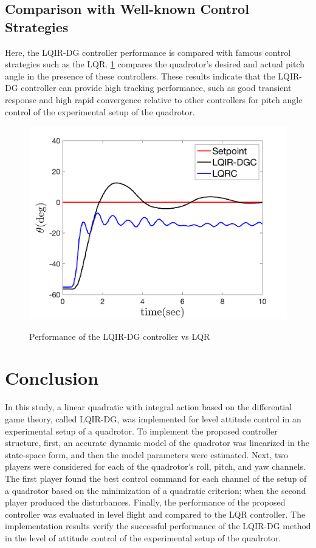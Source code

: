 \documentclass[conference]{IEEEtran}
\begin{document}
\subsection{Comparison with Well-known Control Strategies}



Here, the LQIR-DG controller performance is compared with famous control strategies such as the LQR. \figurename{\ref{fig:compare}} compares the quadrotor's desired and actual pitch angle in the presence of these controllers. These results indicate that the LQIR-DG controller can provide high tracking performance, such as good transient response and high rapid convergence relative to other controllers for pitch angle control of the experimental setup of the quadrotor.


\begin{figure}[!h]
	\centering
	{\includegraphics[width=\linewidth]{../Figures/Calibration/LQIDGvsLQR/Pitch/lqidgvslqr_pitch.png}
	}
	\caption{Performance of the LQIR-DG controller vs LQR}
	\label{fig:compare}
\end{figure}


\section{Conclusion}\label{sec:conclusion}
In this study, a linear quadratic with integral action based on the differential game theory, called LQIR-DG, was implemented for level attitude control in an experimental setup of a quadrotor. To implement the proposed controller structure, first, an accurate dynamic model of the quadrotor was linearized in the state-space form, and then the model parameters were estimated. Next, two players were considered for each of the quadrotor's roll, pitch, and yaw channels. The first player found the best control command for each channel of the setup of a quadrotor based on the minimization of a quadratic criterion; when the second player produced the disturbances. Finally, the performance of the proposed controller was evaluated in level flight and compared to the LQR controller. The implementation results verify the successful performance of the LQIR-DG method in the level of attitude control of the experimental setup of the quadrotor.
\end{document}

